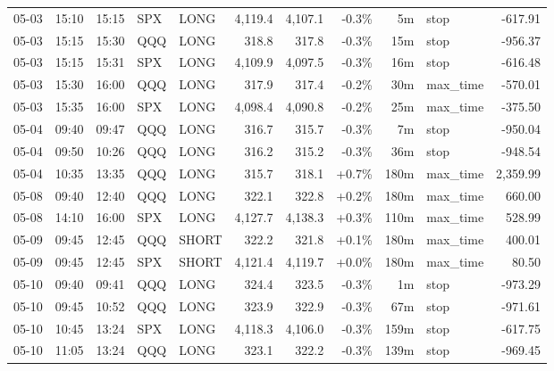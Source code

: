 \documentclass[11pt,a4paper,twoside]{article}
\begin{document}
\begin{center}
\begin{longtable}{>{\color{txtmain}}l l l l l r r r r >{\color{txtmain}}l r}
05-03 & 15:10 & 15:15 & SPX & LONG & 4,119.4 & 4,107.1 & \textcolor{lossred}{-0.3\%} & 5m & stop & \textcolor{lossred}{-617.91} \\
05-03 & 15:15 & 15:30 & QQQ & LONG & 318.8 & 317.8 & \textcolor{lossred}{-0.3\%} & 15m & stop & \textcolor{lossred}{-956.37} \\
05-03 & 15:15 & 15:31 & SPX & LONG & 4,109.9 & 4,097.5 & \textcolor{lossred}{-0.3\%} & 16m & stop & \textcolor{lossred}{-616.48} \\
05-03 & 15:30 & 16:00 & QQQ & LONG & 317.9 & 317.4 & \textcolor{lossred}{-0.2\%} & 30m & max\_time & \textcolor{lossred}{-570.01} \\
05-03 & 15:35 & 16:00 & SPX & LONG & 4,098.4 & 4,090.8 & \textcolor{lossred}{-0.2\%} & 25m & max\_time & \textcolor{lossred}{-375.50} \\
05-04 & 09:40 & 09:47 & QQQ & LONG & 316.7 & 315.7 & \textcolor{lossred}{-0.3\%} & 7m & stop & \textcolor{lossred}{-950.04} \\
05-04 & 09:50 & 10:26 & QQQ & LONG & 316.2 & 315.2 & \textcolor{lossred}{-0.3\%} & 36m & stop & \textcolor{lossred}{-948.54} \\
05-04 & 10:35 & 13:35 & QQQ & LONG & 315.7 & 318.1 & \textcolor{wingreen}{+0.7\%} & 180m & max\_time & \textcolor{wingreen}{2,359.99} \\
05-08 & 09:40 & 12:40 & QQQ & LONG & 322.1 & 322.8 & \textcolor{wingreen}{+0.2\%} & 180m & max\_time & \textcolor{wingreen}{660.00} \\
05-08 & 14:10 & 16:00 & SPX & LONG & 4,127.7 & 4,138.3 & \textcolor{wingreen}{+0.3\%} & 110m & max\_time & \textcolor{wingreen}{528.99} \\
05-09 & 09:45 & 12:45 & QQQ & SHORT & 322.2 & 321.8 & \textcolor{wingreen}{+0.1\%} & 180m & max\_time & \textcolor{wingreen}{400.01} \\
05-09 & 09:45 & 12:45 & SPX & SHORT & 4,121.4 & 4,119.7 & \textcolor{wingreen}{+0.0\%} & 180m & max\_time & \textcolor{wingreen}{80.50} \\
05-10 & 09:40 & 09:41 & QQQ & LONG & 324.4 & 323.5 & \textcolor{lossred}{-0.3\%} & 1m & stop & \textcolor{lossred}{-973.29} \\
05-10 & 09:45 & 10:52 & QQQ & LONG & 323.9 & 322.9 & \textcolor{lossred}{-0.3\%} & 67m & stop & \textcolor{lossred}{-971.61} \\
05-10 & 10:45 & 13:24 & SPX & LONG & 4,118.3 & 4,106.0 & \textcolor{lossred}{-0.3\%} & 159m & stop & \textcolor{lossred}{-617.75} \\
05-10 & 11:05 & 13:24 & QQQ & LONG & 323.1 & 322.2 & \textcolor{lossred}{-0.3\%} & 139m & stop & \textcolor{lossred}{-969.45} \\

\end{longtable}
\end{center}
\end{document}
